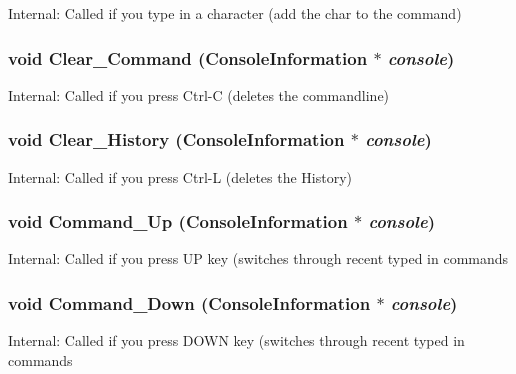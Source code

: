 Internal: Called if you type in a character (add the char to the command) 
\subsubsection{\setlength{\rightskip}{0pt plus 5cm}void Clear\_\-Command ({\bf Console\-Information} $\ast$ {\em console})}\label{CON__console_8h_a44}


Internal: Called if you press Ctrl-C (deletes the commandline) 
\subsubsection{\setlength{\rightskip}{0pt plus 5cm}void Clear\_\-History ({\bf Console\-Information} $\ast$ {\em console})}\label{CON__console_8h_a45}


Internal: Called if you press Ctrl-L (deletes the History) 
\subsubsection{\setlength{\rightskip}{0pt plus 5cm}void Command\_\-Up ({\bf Console\-Information} $\ast$ {\em console})}\label{CON__console_8h_a46}


Internal: Called if you press UP key (switches through recent typed in commands 
\subsubsection{\setlength{\rightskip}{0pt plus 5cm}void Command\_\-Down ({\bf Console\-Information} $\ast$ {\em console})}\label{CON__console_8h_a47}


Internal: Called if you press DOWN key (switches through recent typed in commands 